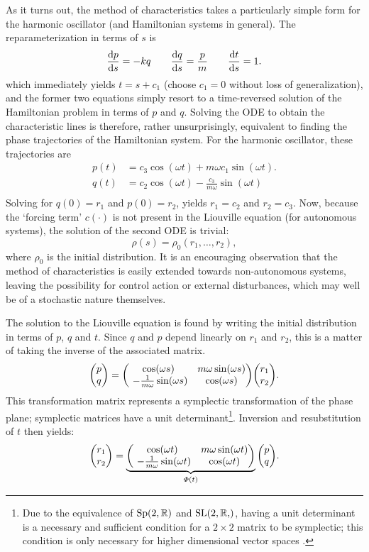 As it turns out, the method of characteristics takes a particularly simple form for the harmonic oscillator (and Hamiltonian systems in general). The reparameterization in terms of $s$ is
\begin{equation}
        \dv{p}{s} = -kq \qquad \dv{q}{s} = \frac{p}{m} \qquad \dv{t}{s} = 1.
\end{equation}
which immediately yields $t = s + c_1$ (choose $c_1 = 0$ without loss of generalization), and the former two equations simply resort to a time-reversed solution of the Hamiltonian problem in terms of $p$ and $q$. Solving the ODE to obtain the characteristic lines is therefore, rather unsurprisingly, equivalent to finding the phase trajectories of the Hamiltonian system. For the harmonic oscillator, these trajectories are
\begin{equation}
    \begin{split}
        p(t) &= c_3\cos(\omega t) + m\omega c_1 \sin(\omega t). \\
        q(t) &= c_2\cos(\omega t) - \frac{c_3}{m\omega}\sin(\omega t)\\
    \end{split}
\end{equation}
Solving for $q(0) = r_1$ and $p(0) = r_2$, yields $r_1 = c_2$ and $r_2 = c_3$. Now, because the `forcing term' $c(\cdot)$ is not present in the Liouville equation (for autonomous systems), the solution of the second ODE is trivial:
$$ \rho(s) = \rho_0(r_1, \ldots, r_2), $$
where $\rho_0$ is the initial distribution. It is an encouraging observation that the method of characteristics is easily extended towards non-autonomous systems, leaving the possibility for control action or external disturbances, which may well be of a stochastic nature themselves.

The solution to the Liouville equation is found by writing the initial distribution in terms of $p$, $q$ and $t$. Since $q$ and $p$ depend linearly on $r_1$ and $r_2$, this is a matter of taking the inverse of the associated matrix.
$$ \mqty(p\\q) = 
    \mqty( \cos(\omega s) & m\omega \sin(\omega s) \\\  -\frac{1}{m\omega}\sin(\omega s) & \cos(\omega s) )\mqty(r_1\\r_2).  $$
This transformation matrix represents a symplectic transformation of the phase plane; symplectic matrices have a unit determinant\footnote{Due to the equivalence of $\mathrm{Sp}(2, \mathbb{R})$ and $\slgroup{2, \real}$, having a unit determinant is a necessary and sufficient condition for a $2\times2$ matrix to be symplectic; this condition is only necessary for higher dimensional vector spaces \cite{Arnold1989}.}. Inversion and resubstitution of $t$ then yields:
$$ \mqty(r_1\\r_2) = \underbrace{\mqty( \cos(\omega t) & m\omega \sin(\omega t) \\\  -\frac{1}{m\omega}\sin(\omega t) & \cos(\omega t) )}_{\Phi(t)}\mqty(p\\q).$$

